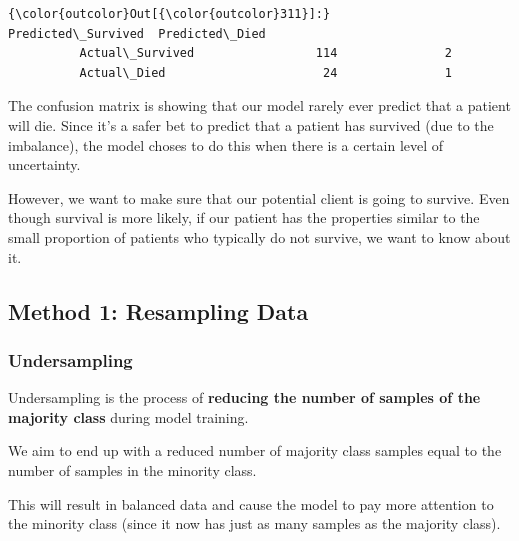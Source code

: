 \documentclass[11pt]{article}
\begin{document}
\begin{Verbatim}[commandchars=\\\{\}]
{\color{outcolor}Out[{\color{outcolor}311}]:}                  Predicted\_Survived  Predicted\_Died
          Actual\_Survived                 114               2
          Actual\_Died                      24               1
\end{Verbatim}
            
    The confusion matrix is showing that our model rarely ever predict that
a patient will die. Since it's a safer bet to predict that a patient has
survived (due to the imbalance), the model choses to do this when there
is a certain level of uncertainty.

However, we want to make sure that our potential client is going to
survive. Even though survival is more likely, if our patient has the
properties similar to the small proportion of patients who typically do
not survive, we want to know about it.

    \subsection{Method 1: Resampling Data}\label{method-1-resampling-data}

\subsubsection{Undersampling}\label{undersampling}

Undersampling is the process of \textbf{reducing the number of samples
of the majority class} during model training.

We aim to end up with a reduced number of majority class samples equal
to the number of samples in the minority class.

This will result in balanced data and cause the model to pay more
attention to the minority class (since it now has just as many samples
as the majority class).
\end{document}
